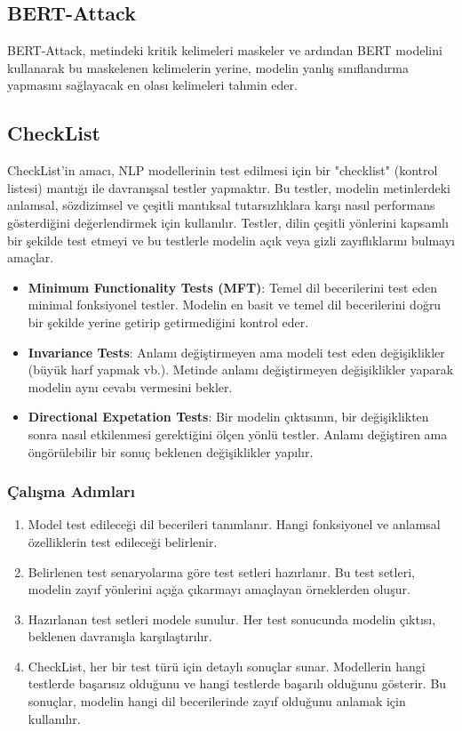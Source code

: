 \newpage

\subsection{BERT-Attack}

BERT-Attack, metindeki kritik kelimeleri maskeler ve ardından BERT modelini kullanarak bu maskelenen kelimelerin yerine, modelin yanlış sınıflandırma yapmasını sağlayacak en olası kelimeleri tahmin eder.

\newpage

\subsection{CheckList}

CheckList'in amacı, NLP modellerinin test edilmesi için bir "checklist" (kontrol listesi) mantığı ile davranışsal testler yapmaktır. Bu testler, modelin metinlerdeki anlamsal, sözdizimsel ve çeşitli mantıksal tutarsızlıklara karşı nasıl performans gösterdiğini değerlendirmek için kullanılır. Testler, dilin çeşitli yönlerini kapsamlı bir şekilde test etmeyi ve bu testlerle modelin açık veya gizli zayıflıklarını bulmayı amaçlar.

\begin{itemize}
    \item \textbf{Minimum Functionality Tests (MFT)}: Temel dil becerilerini test eden minimal fonksiyonel testler. Modelin en basit ve temel dil becerilerini doğru bir şekilde yerine getirip getirmediğini kontrol eder. 
    \item \textbf{Invariance Tests}: Anlamı değiştirmeyen ama modeli test eden değişiklikler (büyük harf yapmak vb.). Metinde anlamı değiştirmeyen değişiklikler yaparak modelin aynı cevabı vermesini bekler.
    \item \textbf{Directional Expetation Tests}: Bir modelin çıktısının, bir değişiklikten sonra nasıl etkilenmesi gerektiğini ölçen yönlü testler. Anlamı değiştiren ama öngörülebilir bir sonuç beklenen değişiklikler yapılır.
\end{itemize}

\subsubsection{Çalışma Adımları}

\begin{enumerate}
    \item Model test edileceği dil becerileri tanımlanır. Hangi fonksiyonel ve anlamsal özelliklerin test edileceği belirlenir.
    \item Belirlenen test senaryolarına göre test setleri hazırlanır. Bu test setleri, modelin zayıf yönlerini açığa çıkarmayı amaçlayan örneklerden oluşur. 
    \item Hazırlanan test setleri modele sunulur. Her test sonucunda modelin çıktısı, beklenen davranışla karşılaştırılır.
    \item CheckList, her bir test türü için detaylı sonuçlar sunar. Modellerin hangi testlerde başarısız olduğunu ve hangi testlerde başarılı olduğunu gösterir. Bu sonuçlar, modelin hangi dil becerilerinde zayıf olduğunu anlamak için kullanılır.
\end{enumerate}

